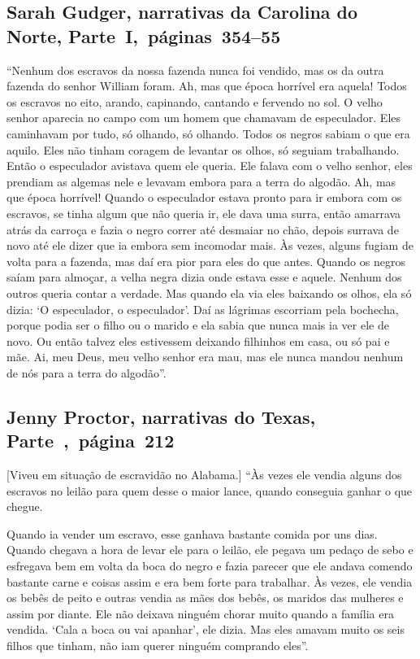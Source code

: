 \subsection{Sarah Gudger, narrativas da Carolina do Norte, Parte~I,~páginas~354--55}
\label{ref115}

``Nenhum dos escravos da nossa fazenda nunca foi vendido, mas os da
outra fazenda do senhor William foram. Ah, mas que época horrível era
aquela! Todos os escravos no eito, arando, capinando, cantando e
fervendo no sol. O velho senhor aparecia no campo com um homem que
chamavam de especulador. Eles caminhavam por tudo, só olhando, só
olhando. Todos os negros sabiam o que era aquilo. Eles não tinham
coragem de levantar os olhos, só seguiam trabalhando. Então o
especulador avistava quem ele queria. Ele falava com o velho senhor,
eles prendiam as algemas nele e levavam embora para a terra do algodão.
Ah, mas que época horrível! Quando o especulador estava pronto para ir
embora com os escravos, se tinha algum que não queria ir, ele dava uma
surra, então amarrava atrás da carroça e fazia o negro correr até
desmaiar no chão, depois surrava de novo até ele dizer que ia embora sem
incomodar mais. Às vezes, alguns fugiam de volta para a fazenda, mas daí
era pior para eles do que antes. Quando os negros saíam para almoçar, a
velha negra dizia onde estava esse e aquele. Nenhum dos outros queria
contar a verdade. Mas quando ela via eles baixando os olhos, ela só
dizia: `O especulador, o especulador'. Daí as lágrimas escorriam pela
bochecha, porque podia ser o filho ou o marido e ela sabia que nunca
mais ia ver ele de novo. Ou então talvez eles estivessem deixando
filhinhos em casa, ou só pai e mãe. Ai, meu Deus, meu velho senhor era
mau, mas ele nunca mandou nenhum de nós para a terra do algodão''.

\subsection{Jenny Proctor, narrativas do Texas, Parte~,~página~212}
\label{ref218}

{[}Viveu em situação de escravidão no Alabama.{]} ``Às vezes ele vendia alguns dos escravos no leilão para quem desse o
maior lance, quando conseguia ganhar o que chegue.

Quando ia vender um escravo, esse ganhava bastante comida por uns dias.
Quando chegava a hora de levar ele para o leilão, ele pegava um pedaço
de sebo e esfregava bem em volta da boca do negro e fazia parecer que
ele andava comendo bastante carne e coisas assim e era bem forte para
trabalhar. Às vezes, ele vendia os bebês de peito e outras vendia as
mães dos bebês, os maridos das mulheres e assim por diante. Ele não
deixava ninguém chorar muito quando a família era vendida. `Cala a boca
ou vai apanhar', ele dizia. Mas eles amavam muito os seis filhos que
tinham, não iam querer ninguém comprando eles''.

